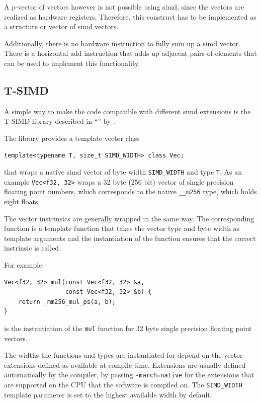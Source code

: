 \documentclass[a4paper, 11pt]{memoir}
\begin{document}
    A p-vector of vectors however is not possible using \gls{simd}, since the vectors are realized as hardware registers.
    Therefore, this construct has to be implemented as a structure or vector of \gls{simd} vectors.
    
    Additionally, there is no hardware instruction to fully sum up a \gls{simd} vector. There is a horizontal add instruction
    that adds up adjacent pairs of elements that can be used to implement this functionality.

    \subsection{T-SIMD}
    \label{sec:tsimd}
    A simple way to make the code compatible with different \gls{simd} extensions is the T-SIMD library described in
    \enquote{} \cite{own_moeller_16_2} by \citeauthor{own_moeller_16_2}.

    The library provides a template vector class
    \begin{verbatim}
template<typename T, size_t SIMD_WIDTH> class Vec;
    \end{verbatim}
    that wraps a native \gls{simd} vector of byte width \texttt{SIMD_WIDTH} and type \texttt{T}. As an
    example \texttt{Vec<f32, 32>} wraps a 32 byte (256 bit) vector of single precision floating point numbers,
    which corresponds to the native \texttt{__m256} type, which holds eight floats.

    The vector instrinsics are generally wrapped in the same way. The corresponding function is a template function that
    takes the vector type and byte width as template arguments and the instantiation of the function ensures that the
    correct instrinsic is called.

    For example
    \begin{verbatim}
Vec<f32, 32> mul(const Vec<f32, 32> &a,
                 const Vec<f32, 32> &b) {
    return _mm256_mul_ps(a, b);
}
    \end{verbatim}
    is the instantiation of the \texttt{mul} function for 32 byte single precision floating point vectors.

    The widths the functions and types are instantiated for depend on the vector extensions defined as available at compile
    time. Extensions are usually defined automatically by the compiler, \eg by passing \texttt{-march=native} for
    the extensions that are supported on the CPU that the software is compiled on. The \texttt{SIMD_WIDTH}
    template parameter is set to the highest available width by default.
\end{document}

